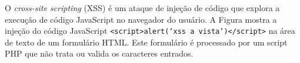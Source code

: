 \begin{frame}{}
O {\it cross-site scripting\/} (XSS) é um ataque de injeção de código que
explora a execução de código JavaScript no navegador do usuário.  A
Figura mostra a injeção do código JavaScript
{\tt <script>alert(`xss a vista')</script>} na área de texto de um formulário
HTML. Este formulário é processado por um script PHP que não trata ou
valida os caracteres entrados. 


\end{frame}

